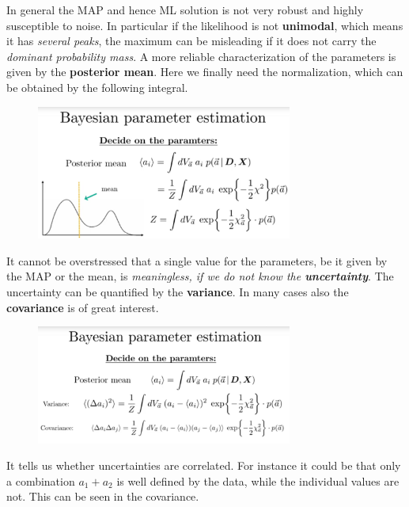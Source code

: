 \documentclass[12pt, a4paper]{scrartcl}
\begin{document}
In general the MAP and hence ML solution is not very robust and highly
susceptible to noise. In particular if the likelihood is not \textbf{unimodal}, which means it has \textit{several peaks}, 
the maximum can be misleading if it does not carry the \textit{dominant probability mass}.
A more reliable characterization of the parameters is given by the \textbf{posterior
mean}.
Here we finally need the normalization, which can be obtained by the following integral.%
\begin{figure}[H]
	\centering
	\includegraphics[width=0.75\textwidth]{7_6.png}
\end{figure}

It cannot be overstressed that a single value for the parameters, be it given
by the MAP or the mean, is \textit{meaningless, if we do not know the \textbf{uncertainty}}.
The uncertainty can be quantified by the \textbf{variance}.
In many cases also the \textbf{covariance} is of great interest.%
\begin{figure}[H]
	\centering
	\includegraphics[width=0.75\textwidth]{7_7.png}
\end{figure}

It tells us whether uncertainties are correlated. For instance it could be that
only a combination $a_1 + a_2$ is well defined by the data, while the individual
values are not. This can be seen in the covariance.\\
\end{document}
